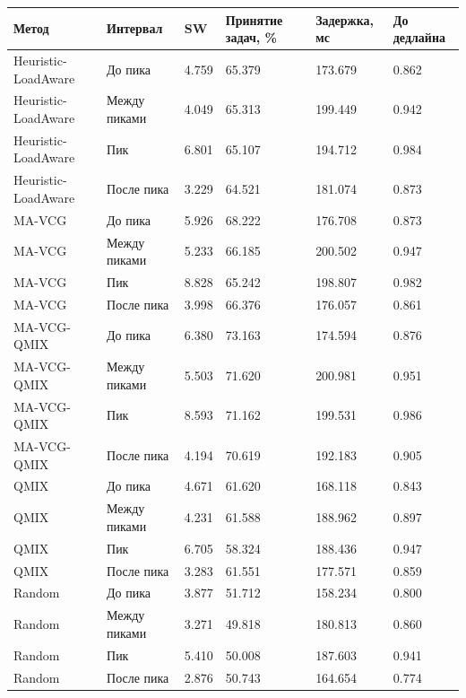 \begin{tabular}{llllll}
\toprule
Метод & Интервал & SW & Принятие задач, \% & Задержка, мс & До дедлайна \\
\midrule
Heuristic-LoadAware & До пика & 4.759 & 65.379 & 173.679 & 0.862 \\
Heuristic-LoadAware & Между пиками & 4.049 & 65.313 & 199.449 & 0.942 \\
Heuristic-LoadAware & Пик & 6.801 & 65.107 & 194.712 & 0.984 \\
Heuristic-LoadAware & После пика & 3.229 & 64.521 & 181.074 & 0.873 \\
MA-VCG & До пика & 5.926 & 68.222 & 176.708 & 0.873 \\
MA-VCG & Между пиками & 5.233 & 66.185 & 200.502 & 0.947 \\
MA-VCG & Пик & 8.828 & 65.242 & 198.807 & 0.982 \\
MA-VCG & После пика & 3.998 & 66.376 & 176.057 & 0.861 \\
MA-VCG-QMIX & До пика & 6.380 & 73.163 & 174.594 & 0.876 \\
MA-VCG-QMIX & Между пиками & 5.503 & 71.620 & 200.981 & 0.951 \\
MA-VCG-QMIX & Пик & 8.593 & 71.162 & 199.531 & 0.986 \\
MA-VCG-QMIX & После пика & 4.194 & 70.619 & 192.183 & 0.905 \\
QMIX & До пика & 4.671 & 61.620 & 168.118 & 0.843 \\
QMIX & Между пиками & 4.231 & 61.588 & 188.962 & 0.897 \\
QMIX & Пик & 6.705 & 58.324 & 188.436 & 0.947 \\
QMIX & После пика & 3.283 & 61.551 & 177.571 & 0.859 \\
Random & До пика & 3.877 & 51.712 & 158.234 & 0.800 \\
Random & Между пиками & 3.271 & 49.818 & 180.813 & 0.860 \\
Random & Пик & 5.410 & 50.008 & 187.603 & 0.941 \\
Random & После пика & 2.876 & 50.743 & 164.654 & 0.774 \\
\bottomrule
\end{tabular}

